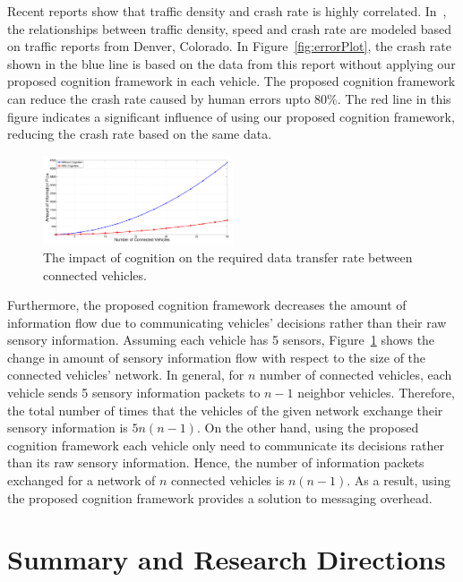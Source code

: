 \documentclass[journal, 11pt]{IEEEtran}
\begin{document}
Recent reports show that traffic density and crash rate is highly correlated.
In~\cite{trb12}, the relationships between traffic density, speed and crash rate
are modeled based on traffic reports from Denver, Colorado. In
Figure~\ref{fig:errorPlot}, the crash rate shown in the blue line is based on
the data from this report without applying our proposed cognition framework in
each vehicle. The proposed cognition framework can reduce the crash rate caused
by human errors upto $80\%$. The red line in this figure indicates a significant
influence of using our proposed cognition framework, reducing the crash rate
based on the same data.\\

\begin{figure}[tbh]
  \centering
  \vspace*{-9mm}
  \includegraphics[width=0.5\textwidth]{figs/infoFlow.pdf}
  \caption{{\fontsize{10}{10}\selectfont The impact of cognition on the required
  data transfer rate between connected vehicles.}}
  \label{fig:infoFlow}
\end{figure}

Furthermore, the proposed cognition framework decreases the amount of
information flow due to communicating vehicles' decisions rather than their raw
sensory information. Assuming each vehicle has 5 sensors,
Figure~\ref{fig:infoFlow} shows the change in amount of sensory information flow
with respect to the size of the connected vehicles' network. In general, for $n$
number of connected vehicles, each vehicle sends 5 sensory information packets
to $n - 1$ neighbor vehicles. Therefore, the total number of times that the
vehicles of the given network exchange their sensory information is $5n(n-1)$.
On the other hand, using the proposed cognition framework each vehicle only
need to communicate its decisions rather than its raw sensory information.
Hence, the number of information packets exchanged for a network of $n$
connected vehicles is $n(n-1)$. As a result, using the proposed cognition
framework provides a solution to messaging overhead.

\section{Summary and Research Directions}
\label{Sec:Conc}
\end{document}
